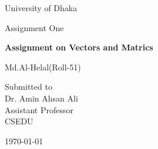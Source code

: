 \documentclass[12pt,a4paper]{report}
\begin{document}
\begin{titlepage}
\centering
{\LARGE University of Dhaka \par}
\vspace{2cm}
{\Large Assignment One\par}
\vspace{2cm}
{\huge\bfseries Assignment on Vectors and Matrics\par}
\vspace{2cm}
{\Large Md.Al-Helal(Roll-51)\par}
\vfill
Submitted to\\
\vspace{0.5cm}
Dr. Amin Ahsan Ali \\ Assistant Professor\\CSEDU
\vfill
{\large \today\par}
\end{titlepage}
\end{document}
